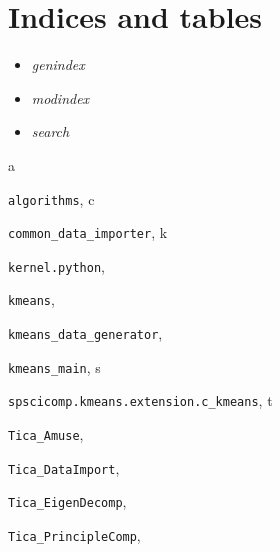 \documentclass[letterpaper,10pt,english]{sphinxmanual}
\begin{document}
\chapter{Indices and tables}
\label{index:indices-and-tables}\begin{itemize}
\item {} 
\emph{genindex}

\item {} 
\emph{modindex}

\item {} 
\emph{search}

\end{itemize}


\renewcommand{\indexname}{Python Module Index}
\begin{theindex}
\def\bigletter#1{{\Large\sffamily#1}\nopagebreak\vspace{1mm}}
\bigletter{a}
\item {\texttt{algorithms}}, \pageref{hmm:module-algorithms}
\indexspace
\bigletter{c}
\item {\texttt{common\_data\_importer}}, \pageref{common:module-common_data_importer}
\indexspace
\bigletter{k}
\item {\texttt{kernel.python}}, \pageref{hmm:module-kernel.python}
\item {\texttt{kmeans}}, \pageref{kmeans:module-kmeans}
\item {\texttt{kmeans\_data\_generator}}, \pageref{kmeans:module-kmeans_data_generator}
\item {\texttt{kmeans\_main}}, \pageref{kmeans:module-kmeans_main}
\indexspace
\bigletter{s}
\item {\texttt{spscicomp.kmeans.extension.c\_kmeans}}, \pageref{kmeans:module-spscicomp.kmeans.extension.c_kmeans}
\indexspace
\bigletter{t}
\item {\texttt{Tica\_Amuse}}, \pageref{tica:module-Tica_Amuse}
\item {\texttt{Tica\_DataImport}}, \pageref{tica:module-Tica_DataImport}
\item {\texttt{Tica\_EigenDecomp}}, \pageref{tica:module-Tica_EigenDecomp}
\item {\texttt{Tica\_PrincipleComp}}, \pageref{tica:module-Tica_PrincipleComp}
\end{theindex}

\renewcommand{\indexname}{Index}
\printindex
\end{document}
